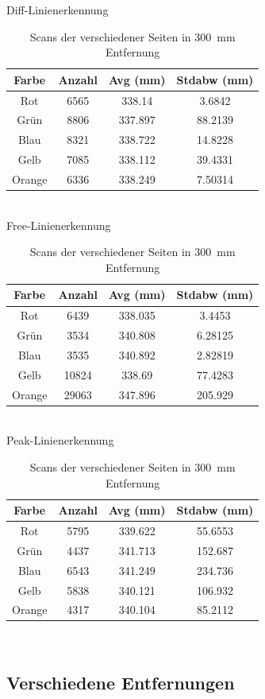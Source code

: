 \documentclass[ngerman,a4paper,parskip=half]{scrartcl}
\begin{document}
\begin{table}[H]
	\centering
	Diff-Linienerkennung \\
	\begin{tabular}{c|c|c|c}
		Farbe & Anzahl & Avg (mm) & Stdabw (mm) \\ \hline
		Rot & 6565 & 338.14 & 3.6842 \\
		Grün & 8806 & 337.897 & 88.2139 \\
		Blau & 8321 & 338.722 & 14.8228 \\
		Gelb & 7085 & 338.112 & 39.4331 \\
		Orange & 6336 & 338.249 & 7.50314 \\
	\end{tabular} \\
	\vspace{1em}
	Free-Linienerkennung \\
		\begin{tabular}{c|c|c|c}
		Farbe & Anzahl & Avg (mm) & Stdabw (mm) \\ \hline
		Rot & 6439 & 338.035 & 3.4453 \\
		Grün & 3534 & 340.808 & 6.28125 \\
		Blau & 3535 & 340.892 & 2.82819 \\
		Gelb & 10824 & 338.69 & 77.4283 \\
		Orange & 29063 & 347.896 & 205.929 \\
	\end{tabular} \\
	\vspace{1em}
	Peak-Linienerkennung \\
		\begin{tabular}{c|c|c|c}
		Farbe & Anzahl & Avg (mm) & Stdabw (mm) \\ \hline
		Rot & 5795 & 339.622 & 55.6553 \\
		Grün & 4437 & 341.713 & 152.687 \\
		Blau & 6543 & 341.249 & 234.736 \\
		Gelb & 5838 & 340.121 & 106.932 \\
		Orange & 4317 & 340.104 & 85.2112 \\
	\end{tabular} \
	\caption{Scans der verschiedener Seiten in 300~mm Entfernung}
	\label{tab:colors}
\end{table}

\subsection{Verschiedene Entfernungen}
\label{sec:dists}
\end{document}
